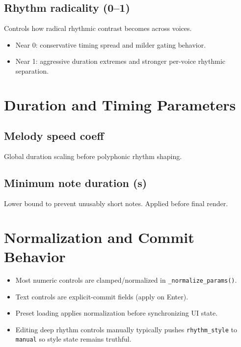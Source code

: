 \documentclass[11pt,a4paper]{article}
\begin{document}
\subsection*{Rhythm radicality (0--1)}
Controls how radical rhythmic contrast becomes across voices.
\begin{itemize}
  \item Near 0: conservative timing spread and milder gating behavior.
  \item Near 1: aggressive duration extremes and stronger per-voice rhythmic separation.
\end{itemize}

\section{Duration and Timing Parameters}
\subsection*{Melody speed coeff}
Global duration scaling before polyphonic rhythm shaping.

\subsection*{Minimum note duration (s)}
Lower bound to prevent unusably short notes. Applied before final render.

\section{Normalization and Commit Behavior}
\begin{itemize}
  \item Most numeric controls are clamped/normalized in \texttt{\_normalize\_params()}.
  \item Text controls are explicit-commit fields (apply on Enter).
  \item Preset loading applies normalization before synchronizing UI state.
  \item Editing deep rhythm controls manually typically pushes \texttt{rhythm\_style} to \texttt{manual} so style state remains truthful.
\end{itemize}
\end{document}
